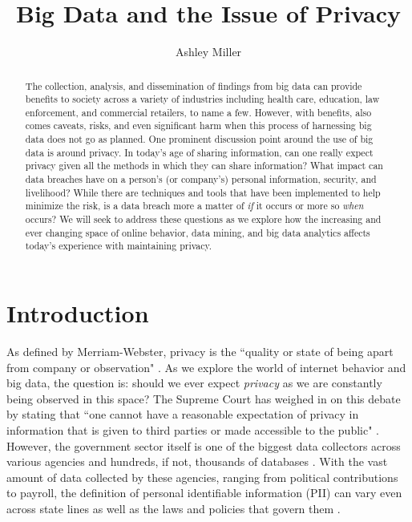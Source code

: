 \documentclass[sigconf]{acmart}
\begin{document}
\title{Big Data and the Issue of Privacy}


\author{Ashley Miller}



\renewcommand{\shortauthors}{G. v. Laszewski}


\begin{abstract}
The collection, analysis, and dissemination of findings from big data can provide benefits to society across a variety of industries including health care, education, law enforcement, and commercial retailers, to name a few. However, with benefits, also comes caveats, risks, and even significant harm when this process of harnessing big data does not go as planned. One prominent discussion point around the use of big data is around privacy. In today's age of sharing information, can one really expect privacy given all the methods in which they can share information? What impact can data breaches have on a person's (or company's) personal information, security, and livelihood? While there are techniques and tools that have been implemented to help minimize the risk, is a data breach more a matter of \textit{if} it occurs or more so \textit{when} occurs? We will seek to address these questions as we explore how the increasing and ever changing space of online behavior, data mining, and big data analytics affects today's experience with maintaining privacy.  
\end{abstract}


\maketitle

\section{Introduction}

As defined by Merriam-Webster, privacy is the ``quality or state of being apart from company or observation" \cite{Merriam-Webster2017}. As we explore the world of internet behavior and big data, the question is: should we ever expect \textit{privacy} as we are constantly being observed in this space? The Supreme Court has weighed in on this debate by stating that ``one cannot have a reasonable expectation of privacy in information that is given to third parties or made accessible to the public" \cite{Review2014}. However, the government sector itself is one of the biggest data collectors across various agencies and hundreds, if not, thousands of databases \cite{Review2014}. With the vast amount of data collected by these agencies, ranging from political contributions to payroll, the definition of personal identifiable information (PII) can vary even across state lines as well as the laws and policies that govern them \cite{Agelidis2016}. 
\end{document}
